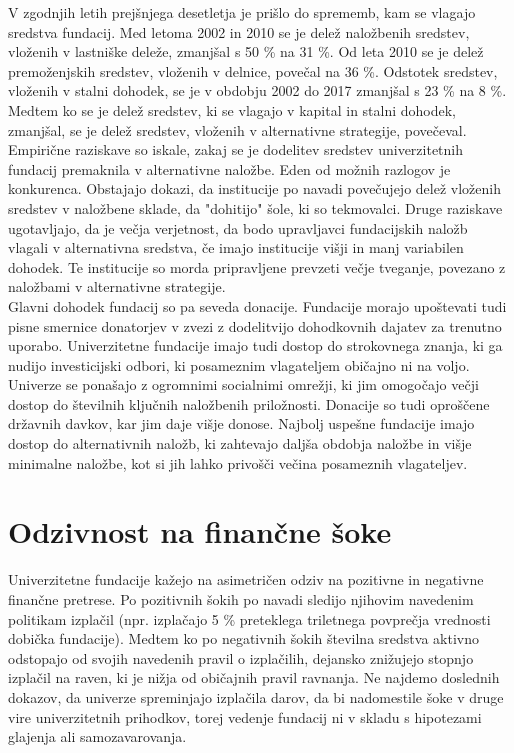 \documentclass[12pt, a4paper]{article}
\begin{document}
V zgodnjih letih prejšnjega desetletja je prišlo do sprememb, kam se vlagajo sredstva fundacij. Med letoma 2002 in 2010 se je delež naložbenih sredstev, vloženih v lastniške deleže, zmanjšal s 50 \% na 31 \%. Od leta 2010 se je delež premoženjskih sredstev, vloženih v delnice, povečal na 36 \%. Odstotek sredstev, vloženih v stalni dohodek, se je v obdobju 2002 do 2017 zmanjšal s 23 \% na 8 \%. Medtem ko se je delež sredstev, ki se vlagajo v kapital in stalni dohodek, zmanjšal, se je delež sredstev, vloženih v alternativne strategije, povečeval. Empirične raziskave so iskale, zakaj se je dodelitev sredstev univerzitetnih fundacij premaknila v alternativne naložbe. Eden od možnih razlogov je konkurenca. Obstajajo dokazi, da institucije po navadi povečujejo delež vloženih sredstev v naložbene sklade, da "dohitijo" šole, ki so tekmovalci. Druge raziskave ugotavljajo, da je večja verjetnost, da bodo upravljavci fundacijskih naložb vlagali v alternativna sredstva, če imajo institucije višji in manj variabilen dohodek. Te institucije so morda pripravljene prevzeti večje tveganje, povezano z naložbami v alternativne strategije.\cite{investment2}\\

Glavni dohodek fundacij so pa seveda donacije. Fundacije morajo upoštevati tudi pisne smernice donatorjev v zvezi z dodelitvijo dohodkovnih dajatev za trenutno uporabo. Univerzitetne fundacije imajo tudi dostop do strokovnega znanja, ki ga nudijo investicijski odbori, ki posameznim vlagateljem običajno ni na voljo. Univerze se ponašajo z ogromnimi socialnimi omrežji, ki jim omogočajo večji dostop do številnih ključnih naložbenih priložnosti.
Donacije so tudi oproščene državnih davkov, kar jim daje višje donose. Najbolj uspešne fundacije imajo dostop do alternativnih naložb, ki zahtevajo daljša obdobja naložbe in višje minimalne naložbe, kot si jih lahko privošči večina posameznih vlagateljev. \cite{Investopedia2}

\section[Odzivnost na finančne šoke]{Odzivnost na finančne šoke}

Univerzitetne fundacije kažejo na asimetričen odziv na pozitivne in negativne finančne pretrese. Po pozitivnih šokih po navadi sledijo njihovim navedenim politikam izplačil (npr. izplačajo 5 \% preteklega triletnega povprečja vrednosti dobička fundacije). Medtem ko po negativnih šokih številna sredstva aktivno odstopajo od svojih navedenih pravil o izplačilih, dejansko znižujejo stopnjo izplačil na raven, ki je nižja od običajnih pravil ravnanja. Ne najdemo doslednih dokazov, da univerze spreminjajo izplačila darov, da bi nadomestile šoke v druge vire univerzitetnih prihodkov, torej vedenje fundacij ni v skladu s hipotezami glajenja ali samozavarovanja.\\
\end{document}

